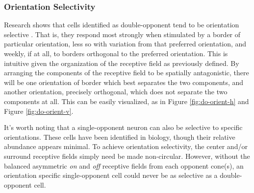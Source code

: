 \documentclass[journal,onecolumn]{IEEEtran}
\begin{document}
\subsubsection*{Orientation Selectivity}

Research shows that cells identified as double-opponent tend to be orientation selective \cite{johnson:2008, sincich:2005, schluppeck:2002, chalupa:vol2}. That is, they respond most strongly when stimulated by a border of particular orientation, less so with variation from that preferred orientation, and weekly, if at all, to borders orthogonal to the preferred orientation. This is intuitive given the organization of the receptive field as previously defined. By arranging the components of the receptive field to be spatially antagonistic, there will be one orientation of border which best separates the two components, and another orientation, precisely orthogonal, which does not separate the two components at all. This can be easily visualized, as in Figure \ref{fig:do-orient-h} and Figure \ref{fig:do-orient-v}.

It's worth noting that a single-opponent neuron can also be selective to specific orientations. These cells have been identified in biology, though their relative abundance appears minimal. To achieve orientation selectivity, the center and/or surround receptive fields simply need be made non-circular. However, without the balanced asymmetric \textit{on} and \textit{off} receptive fields from each opponent cone(s), an orientation specific single-opponent cell could never be as selective as a double-opponent cell.
\end{document}
